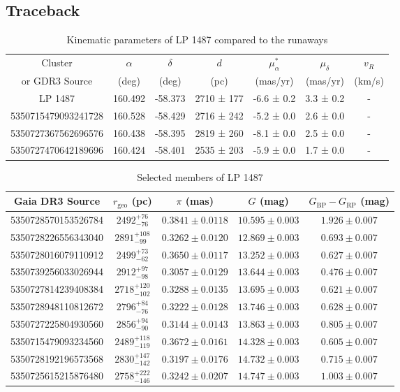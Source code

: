     \subsection{Traceback}
    

\begin{table*}[h]
\caption{Kinematic parameters of LP 1487 compared to the runaways}
\begin{tabular}{ccccccc}
\hline
Cluster & $\alpha$ & $\delta$ & $d$ & $\mu_{\alpha}^*$ & $\mu_{\delta}$ & $v_R$ \\
or GDR3 Source & (deg) & (deg) & (pc) & (mas/yr) & (mas/yr) & (km/s) \\
\hline
LP 1487 & 160.492 & -58.373 & 2710 ± 177 & -6.6 ± 0.2 & 3.3 ± 0.2 & - \\
5350715479093241728 & 160.528 & -58.429 & 2716 ± 242 & -5.2 ± 0.0 & 2.6 ± 0.0 & - \\
5350727367562696576 & 160.438 & -58.395 & 2819 ± 260 & -8.1 ± 0.0 & 2.5 ± 0.0 & - \\
5350727470642189696 & 160.424 & -58.401 & 2535 ± 203 & -5.9 ± 0.0 & 1.7 ± 0.0 & - \\
\hline
\end{tabular}
\end{table*}


\begin{table*}[h]
\caption{Selected members of LP 1487}
\label{tab:LP_1487_members}
\begin{tabular}{ccccc}
\hline
Gaia DR3 Source & $r_{\text{geo}}$ (pc) & $\pi$ (mas) & $G$ (mag) & $G_{\text{BP}}-G_{\text{RP}}$ (mag) \\
\hline
5350728570153526784 & $2492^{+76}_{-76}$ & $0.3841\pm0.0118$ & $10.595\pm0.003$ & $1.926\pm0.007$ \\
5350728226556343040 & $2891^{+108}_{-99}$ & $0.3262\pm0.0120$ & $12.869\pm0.003$ & $0.693\pm0.007$ \\
5350728016079110912 & $2499^{+73}_{-62}$ & $0.3650\pm0.0117$ & $13.252\pm0.003$ & $0.627\pm0.007$ \\
5350739256033026944 & $2912^{+97}_{-98}$ & $0.3057\pm0.0129$ & $13.644\pm0.003$ & $0.476\pm0.007$ \\
5350727814239408384 & $2718^{+120}_{-102}$ & $0.3288\pm0.0135$ & $13.695\pm0.003$ & $0.621\pm0.007$ \\
5350728948110812672 & $2796^{+84}_{-76}$ & $0.3222\pm0.0128$ & $13.746\pm0.003$ & $0.628\pm0.007$ \\
5350727225804930560 & $2856^{+94}_{-90}$ & $0.3144\pm0.0143$ & $13.863\pm0.003$ & $0.805\pm0.007$ \\
5350715479093234560 & $2489^{+118}_{-119}$ & $0.3672\pm0.0161$ & $14.328\pm0.003$ & $0.605\pm0.007$ \\
5350728192196573568 & $2830^{+147}_{-142}$ & $0.3197\pm0.0176$ & $14.732\pm0.003$ & $0.715\pm0.007$ \\
5350725615215876480 & $2758^{+222}_{-146}$ & $0.3242\pm0.0207$ & $14.747\pm0.003$ & $1.003\pm0.007$ \\
\hline
\end{tabular}
\end{table*}
